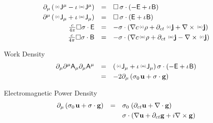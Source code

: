 \documentclass[aps,twocolumn,secnumarabic,nobalancelastpage,amsmath,amssymb,
amsthm,nofootinbib,parskip=full]{revtex4}
\numberwithin{equation}{section}
\newcommand{\iu}{\iota\mkern1mu}
\newcommand{\pauli}[1]{\sigma_#1\mkern2mu}
\newcommand{\qv}[1]{\mathbf{\mathsf{#1}}}
\newcommand{\ppv}[2]{{\,\raisebox{2pt}{\scalebox{.5}{(#1)\,}}}#2}
\newcommand{\qvl}[2]{\ppv{#1}{\mathbf{\mathsf{#2}}}}
\newcommand{\sv}[1]{\mathbf{#1}}
\newcommand{\svl}[2]{\ppv{#1}{\sv{#2}}}
\newcommand{\ssl}[2]{\ppv{#1}{#2}}
\begin{document}
\begin{equation*}
\begin{array}{rcl}
\partial_\mu\left(\qvl{e}{J}^\mu-\iu\qvl{m}{J}^\mu\right)&=&
\Box\,\sigma\cdot\left(-\qv{E}+\iu\qv{B}\right) \\[3pt]
\partial^\mu\left(\qvl{e}{J}_\mu+\iu\qvl{m}{J}_\mu\right)&=&
\Box\,\sigma\cdot\left(\qv{E}+\iu\qv{B}\right) \\[3pt]
\frac{c}{4\pi}\Box\sigma\cdot\qv{E}
       &=&-\sigma\cdot\left(\nabla c\ssl{e}{\rho}+\partial_{ct}\,\svl{e}{j}
          +\nabla\times\svl{m}{j}\right) \\[3pt]
\frac{c}{4\pi}\Box\sigma\cdot\qv{B}
       &=&-\sigma\cdot\left(\nabla c\ssl{m}{\rho}+\partial_{ct}\,\svl{m}{j}
          -\nabla\times\svl{e}{j}\right)
\end{array}
\end{equation*}

Work Density
\begin{equation*}
\begin{array}{rcl}
  \partial_\mu\partial^\mu\qv{A}_\mu\partial_\mu\qv{A}^\mu&=&
              \left(\qvl{e}{J}_\mu+\iu\qvl{m}{J}_\mu\right)
              \sigma\cdot\left(-\qv{E}+\iu\qv{B}\right) \\[3pt]
  &=&-2\partial_\mu
      \left(\pauli{0}\mathbf{u}+\sigma\cdot\mathbf{g}\right)
\end{array}
\end{equation*}

Electromagnetic Power Density
\begin{equation*}
\begin{array}{rcl}
  \partial_\mu\left(\pauli{0}\mathbf{u}+\sigma\cdot\mathbf{g}\right)
  &=&\pauli{0}
       \left(\partial_{ct}\mathbf{u}+\nabla\cdot\mathbf{g}\right)\\[3pt]
   &&\sigma\cdot\left(\nabla\mathbf{u}+\partial_{ct}\mathbf{g}+
                       i\nabla\times\mathbf{g}\right) \\[3pt]
\end{array}
\end{equation*}
\end{document}
